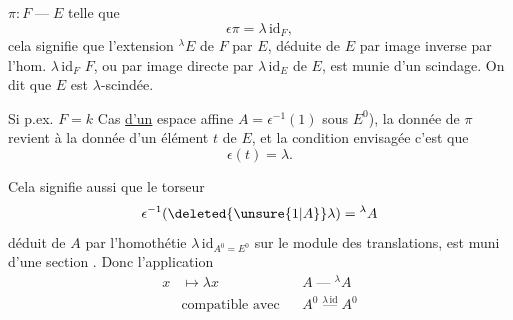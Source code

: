 $\pi:F\mathbin{\text{---}}E$ telle que
\[
\epsilon\pi=\lambda\,\mathrm{id}_F,
\]
cela signifie que l'extension
$ {}^{\lambda}E$ de $F$ par $E$, déduite de $E$ par
image inverse par l'hom. $\lambda\,\mathrm{id}_F$  $F$,
ou par image directe par $\lambda\,\mathrm{id}_E$ de $E$,
est munie d'un scindage.
On dit que $E$ est $\lambda$-scindée.

Si p.ex. $F=k$ Cas \uline{d'}\uline{un} espace
affine $A=\epsilon^{-1}(1)$ sous $E^0$), la
donnée de $\pi$  revient à la donnée
d'un élément $t$ de $E$, et la
condition envisagée c'est que
\[
\epsilon(t)=\lambda .
\]

Cela signifie aussi que le torseur
\[
\epsilon^{-1}(\deleted{\unsure{1|A}}\lambda)={}^{\lambda}A
\]
déduit de $A$ par l'homothétie $\lambda\,\mathrm{id}_{A^0=E^0}$
sur le module des translations, est
muni d'une section . Donc
l'application
\[
\begin{aligned}
x&\longmapsto\lambda x && A\mathbin{\text{---}}{}^\lambda A\\
&\text{compatible avec} && A^0\mathrel{\mathop{\text{---}}\limits^{\lambda\,\mathrm{id}}} A^0
\end{aligned}
\]
